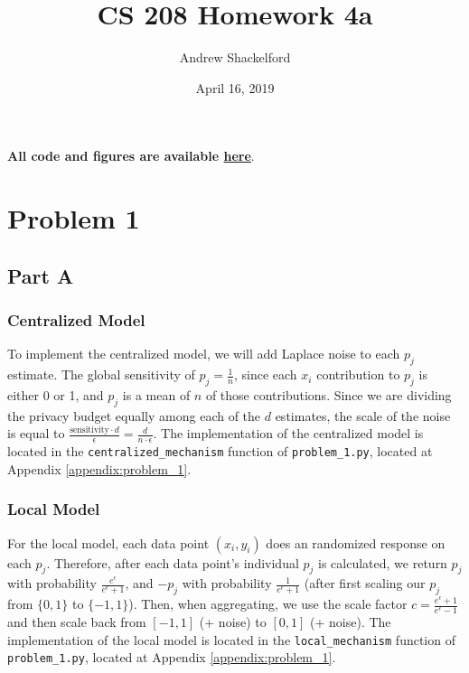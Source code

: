 \documentclass[12pt]{article}
\title{CS 208 Homework 4a}
\author{Andrew Shackelford}
\date{April 16, 2019}
\def\cl{\lstinline}
\begin{document}
\maketitle

\textbf{All code and figures are available \href{https://github.com/andrew-shackelford/cs208/tree/master/4a}{here}}.

{
  \hypersetup{linkcolor=black, hidelinks}
  \tableofcontents
}

\newpage

\section{Problem 1}

\subsection{Part A}

\subsubsection{Centralized Model}

\noindent

To implement the centralized model, we will add Laplace noise to each $p_j$ estimate. The global sensitivity of $p_j = \frac{1}{n}$, since each $x_i$ contribution to $p_j$ is either 0 or 1, and $p_j$ is a mean of $n$ of those contributions. Since we are dividing the privacy budget equally among each of the $d$ estimates, the scale of the noise is equal to $\frac{\text{sensitivity} \cdot d}{\epsilon} = \frac{d}{n \cdot \epsilon}$. The implementation of the centralized model is located in the \cl{centralized_mechanism} function of \cl{problem_1.py}, located at Appendix \ref{appendix:problem_1}.

\subsubsection{Local Model}

\noindent

For the local model, each data point $(x_i, y_i)$ does an randomized response on each $p_j$. Therefore, after each data point's individual $p_j$ is calculated, we return $p_j$ with probability $\frac{e^\epsilon}{e^\epsilon + 1}$, and $-p_j$ with probability $\frac{1}{e^\epsilon + 1}$ (after first scaling our $p_j$ from $\{0, 1\}$ to $\{-1, 1\}$). Then, when aggregating, we use the scale factor $c = \frac{e^\epsilon + 1}{e^\epsilon - 1}$ and then scale back from $[-1, 1]$ (+ noise) to $[0, 1]$ (+ noise). The implementation of the local model is located in the \cl{local_mechanism} function of \cl{problem_1.py}, located at Appendix \ref{appendix:problem_1}.
\end{document}
